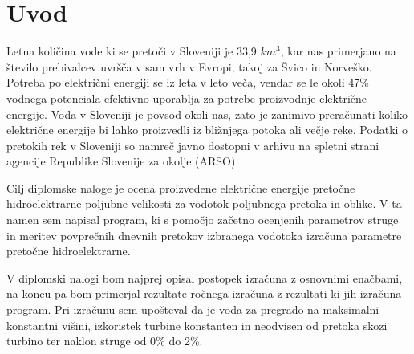 
\chapter{Uvod}\label{sec: Uvod}
\thispagestyle{fancy}



Letna količina vode ki se pretoči v Sloveniji je 33,9 $km^{3}$, kar nas primerjano na število prebivalcev uvršča v sam vrh v Evropi, takoj za Švico in Norveško. Potreba po električni energiji se iz leta v leto veča, vendar se le okoli 47\% vodnega potenciala efektivno uporablja za potrebe proizvodnje električne energije. Voda v Sloveniji je povsod okoli nas, zato je zanimivo preračunati koliko električne energije bi lahko proizvedli iz bližnjega potoka ali večje reke. Podatki o pretokih rek v Sloveniji so namreč javno dostopni v arhivu na spletni strani agencije Republike Slovenije za okolje (ARSO). \cite{HEnaSrednjiSavi}


Cilj diplomske naloge je ocena proizvedene električne energije pretočne hidroelektrarne poljubne velikosti za vodotok poljubnega pretoka in oblike. V ta namen sem napisal program, ki s pomočjo začetno ocenjenih parametrov struge in meritev povprečnih dnevnih pretokov izbranega vodotoka izračuna parametre pretočne hidroelektrarne. 


V diplomski nalogi bom najprej opisal postopek izračuna z osnovnimi enačbami, na koncu pa bom primerjal rezultate ročnega izračuna z rezultati ki jih izračuna program. Pri izračunu sem upošteval da je voda za pregrado na maksimalni konstantni višini, izkoristek turbine konstanten in neodvisen od pretoka skozi turbino ter naklon struge od 0\% do 2\%.



